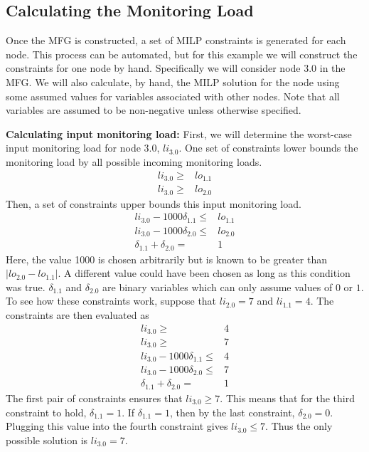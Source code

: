 \subsection{Calculating the Monitoring Load}
Once the MFG is constructed, a set of MILP constraints is generated for each
node. This process can be automated, but for this example we will construct the
constraints for one node by hand. Specifically we will consider node 3.0 in the
MFG. We will also calculate, by hand, the MILP solution for the node using some
assumed values for variables associated with other nodes. Note that all
variables are assumed to be non-negative unless otherwise specified.

{\bf Calculating input monitoring load:}
First, we will determine the worst-case input monitoring load for node
3.0, $li_{3.0}$.  One set of constraints lower bounds the monitoring load by all possible
incoming monitoring loads.
\begin{align*}
  li_{3.0} \geq& lo_{1.1} \\
  li_{3.0} \geq& lo_{2.0} 
\end{align*}
Then, a set of constraints upper bounds this input monitoring load.
\begin{align*}
  li_{3.0} - 1000 \delta_{1.1} \leq& lo_{1.1} \\
  li_{3.0} - 1000 \delta_{2.0} \leq& lo_{2.0} \\
  \delta_{1.1} + \delta_{2.0} =& 1
\end{align*}
Here, the value 1000 is chosen arbitrarily but is known to be greater than
$|lo_{2.0} - lo_{1.1}|$.  A different value could have been chosen as long as this
condition was true. 
$\delta_{1.1}$ and $\delta_{2.0}$ are binary variables which can only assume values of $0$ or $1$.
To see how these constraints work, suppose that $li_{2.0} =
7$ and $li_{1.1} = 4$. The constraints are then evaluated as
\begin{align*}
  li_{3.0} \geq& 4 \\
  li_{3.0} \geq& 7 \\
  li_{3.0} - 1000 \delta_{1.1} \leq& 4 \\
  li_{3.0} - 1000 \delta_{2.0} \leq& 7 \\
  \delta_{1.1} + \delta_{2.0} =& 1
\end{align*}
The first pair of constraints ensures that $li_{3.0} \geq 7$. This means that
for the third constraint to hold, $\delta_{1.1} = 1$. If $\delta_{1.1} = 1$,
then by the last constraint, $\delta_{2.0} = 0$. Plugging this value into the
fourth constraint gives $li_{3.0} \leq 7$. Thus the only possible solution is
$li_{3.0} = 7$.

